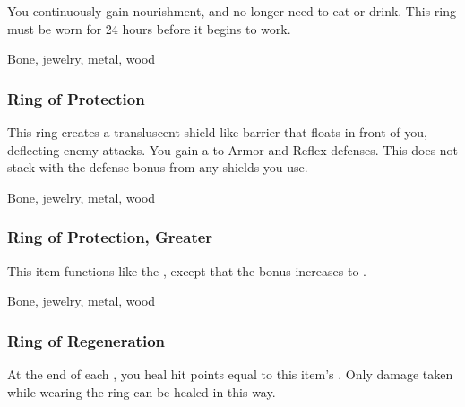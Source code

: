 You continuously gain nourishment, and no longer need to eat or drink.
This ring must be worn for 24 hours before it begins to work.



 


 Bone, jewelry, metal, wood


\lowercase{\hypertarget{item:Ring of Protection}{}}\label{item:Ring of Protection}
\hypertarget{item:Ring of Protection}{\subsubsection{Ring of Protection\hfill{}}}

This ring creates a transluscent shield-like barrier that floats in front of you, deflecting enemy attacks.
You gain a   to Armor and Reflex defenses.
This does not stack with the defense bonus from any shields you use.



 


 Bone, jewelry, metal, wood


\lowercase{\hypertarget{item:Ring of Protection, Greater}{}}\label{item:Ring of Protection, Greater}
\hypertarget{item:Ring of Protection, Greater}{\subsubsection{Ring of Protection, Greater\hfill{}}}

This item functions like the , except that the bonus increases to .



 


 Bone, jewelry, metal, wood


\lowercase{\hypertarget{item:Ring of Regeneration}{}}\label{item:Ring of Regeneration}
\hypertarget{item:Ring of Regeneration}{\subsubsection{Ring of Regeneration\hfill{}}}

At the end of each , you heal hit points equal to this item's .
Only damage taken while wearing the ring can be healed in this way.



